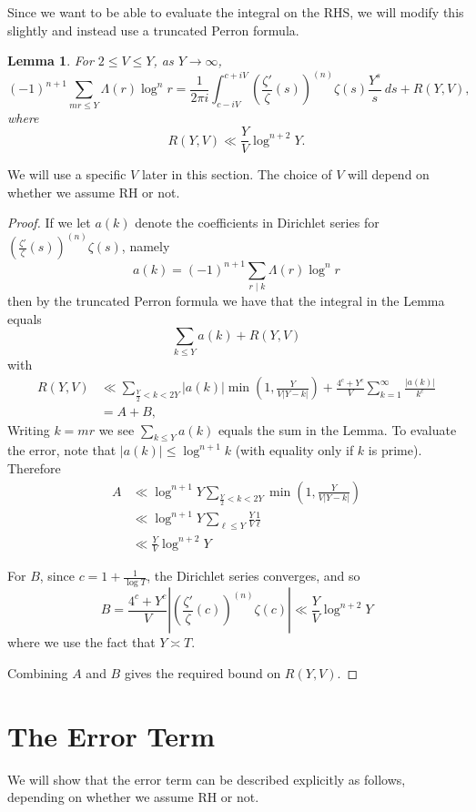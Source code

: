 \documentclass[12pt,a4paper,reqno]{amsart}
\newtheorem{lemma}{Lemma}
\theoremstyle{remark}
\numberwithin{equation}{section}
\begin{document}
Since we want to be able to evaluate the integral on the RHS, we will modify this slightly and instead use a truncated Perron formula.

\begin{lemma}\label{lem:SumOverLambdaEqualsLR}
For $2 \leq V \leq Y$, as $Y \to \infty$,
\[
(-1)^{n+1} \sum_{m r \leq Y} \Lambda (r) \log ^n r = \frac{1}{2 \pi i } \int_{c- iV}^{c + iV} \left( \frac{\zeta'}{\zeta}(s) \right)^{(n)} \zeta(s) \frac{Y^s}{s} \ ds + R(Y,V),
\]
where
\[
R(Y,V) \ll \frac{Y}{V} \log^{n+2} Y.
\]
\end{lemma}
We will use a specific $V$ later in this section. The choice of $V$ will depend on whether we assume RH or not.

\begin{proof}
If we let $a(k)$ denote the coefficients in Dirichlet series for  $\left( \frac{\zeta'}{\zeta}(s) \right)^{(n)} \zeta(s)$, namely 
\[
a(k) = (-1)^{n+1} \sum_{r \mid k} \Lambda(r) \log^n r 
\]
then by the truncated Perron formula \cite[Ch. 5, Sect. 5.1]{MNT} we have that the integral in the Lemma equals 
\[
\sum_{k\leq Y} a(k) + R(Y,V)
\]
with
\begin{align*}
R(Y,V) &\ll \sum_{\frac{Y}{2} < k < 2Y} |a(k)| \min \left( 1, \frac{Y}{V |Y-k|} \right) + \frac{4^c+Y^{c}}{V} \sum_{k=1}^{\infty} \frac{|a(k)|}{k^{c}} \\
& = A+B,
\end{align*}
Writing $k=mr$ we see $\sum_{k\leq Y} a(k)$ equals the sum in the Lemma. To evaluate the error, note that $|a(k)| \leq \log^{n+1} k$ (with equality only if $k$ is prime). Therefore
\begin{align*}
    A &\ll \log^{n+1} Y \sum_{\frac{Y}{2} < k< 2Y} \min \left( 1, \frac{Y}{V |Y-k|} \right) \\
    &\ll \log^{n+1} Y \sum_{\ell \leq Y} \frac{Y}{V} \frac{1}{\ell} \\
    &\ll \frac{Y}{V} \log^{n+2} Y
\end{align*}

For $B$, since $c=1+\frac{1}{\log T}$, the Dirichlet series converges, and so 
\[
B = \frac{4^c+Y^c}{V} \left| \left( \frac{\zeta'}{\zeta}(c) \right)^{(n)} \zeta(c) \right| \ll \frac{Y}{V} \log^{n+2} Y
\]
where we use the fact that $Y \asymp T$.

Combining $A$ and $B$ gives the required bound on $R(Y,V)$.
\end{proof}



\section{The Error Term} \label{sect: ErrorTerm}
We will show that the error term can be described explicitly as follows, depending on whether we assume RH or not. 
\end{document}
